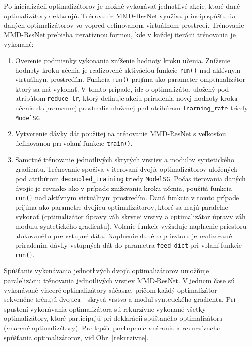 Po inicializácii optimalizátorov je možné vykonávať jednotlivé akcie, ktoré dané optimalizátory deklarujú. Trénovanie MMD-ResNet využíva princíp spúšťania daných optimalizátorov vo vopred definovanom virtuálnom prostredí. Trénovanie MMD-ResNet prebieha iteratívnou formou, kde v každej iterácii trénovania je vykonané:
\begin{enumerate}
    \item Overenie podmienky vykonania zníženie hodnoty kroku učenia. Zníženie hodnoty kroku učenia je realizovené aktiváciou funkcie \texttt{run()} nad aktívnym virtuálnym prostredím. Funkcia \texttt{run()} prijíma ako parameter omptimalizátor ktorý sa má vykonať. V tomto prípade, ide o optimalizátor uložený pod atribútom \texttt{reduce_lr}, ktorý definuje akciu priradenia novej hodnoty kroku učenia do premennej prostredia uloženej pod atribúrom \texttt{learning_rate} triedy \texttt{ModelSG}
    \item Vytvorenie dávky dát použitej na trénovanie MMD-ResNet s veľkosťou definovanou pri volaní funkcie \texttt{train()}.
    \item Samotné trénovanie jednotlivých skrytých vrstiev a modulov syntetického gradientu. Trénovanie spočíva v iterovaní dvojíc optimalizátorov uložených pod atribútom \texttt{decoupled_training} triedy \texttt{ModelSG}. Počas iterovania daných dvojíc je rovnako ako v prípade znižovania kroku učenia, použitá funkcia \texttt{run()} nad aktívnym virtuálnym prostredím. Daná funkcia v tomto prípade prijíma ako parametre dvojicu optimalizátorov, ktoré sa majú paralelne vykonať (optimalizátor úpravy váh skrytej vrstvy a optimalizátor úpravy váh modulu syntetického gradientu). Volanie funkcie vyžaduje naplnenie priestoru alokovaného pre vstupné dáta. Naplnenie daného priestoru je realizované priradením dávky vstupných dát do parametra \texttt{feed_dict} pri volaní funkcie \texttt{run()}.
\end{enumerate}

Spúšťanie vykonávania jednotlivých dvojíc optimalizátorov umožňuje paralelizáciu trénovania jednotlivých vrstiev MMD-ResNet. V jednom čase sú vykonávané viaceré optimalizátory súčasne, pričom každý optimalízátor sekvenčne trénujú dvojicu - skrytá vrstva a modul syntetického gradientu. Pri spustení vykonávania optimalizátora sú rekurzívne vykonané všetky optimalizátory, ktoré participujú pri deklarácii spúšťaného optimalizátora (vnorené optimalizátory). Pre lepšie pochopenie vnárania a rekurzívneho spúšťania optimalizátorov, viď Obr. \ref{rekurzivne}.

